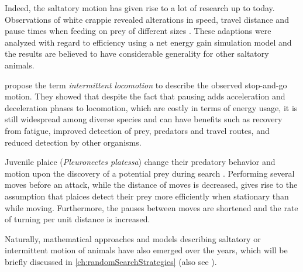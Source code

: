 Indeed, the saltatory motion has given rise to a lot of research up to today. Observations of white crappie revealed alterations in speed, travel distance and pause times when feeding on prey of different sizes \cite{obrien:1989}. These adaptions were analyzed with regard to efficiency using a net energy gain simulation model and the results are believed to have considerable generality for other saltatory animals.

 propose the term \textit{intermittent locomotion} to describe the observed stop-and-go motion. They showed that despite the fact that pausing adds acceleration and deceleration phases to locomotion, which are costly in terms of energy usage, it is still widespread among diverse species and can have benefits such as recovery from fatigue, improved detection of prey, predators and travel routes, and reduced detection by other organisms.

Juvenile plaice (\textit{Pleuronectes platessa}) change their predatory behavior and motion upon the discovery of a potential prey during search \cite{hill:2000}. Performing several moves before an attack, while the distance of moves is decreased, gives rise to the assumption that plaices detect their prey more efficiently when stationary than while moving. Furthermore, the pauses between moves are shortened and the rate of turning per unit distance is increased.

Naturally, mathematical approaches and models describing saltatory or intermittent motion of animals have also emerged over the years, which will be briefly discussed in \autoref{ch:randomSearchStrategies} (also see \eg \cite{reynolds:2006, benichou:2011}).

